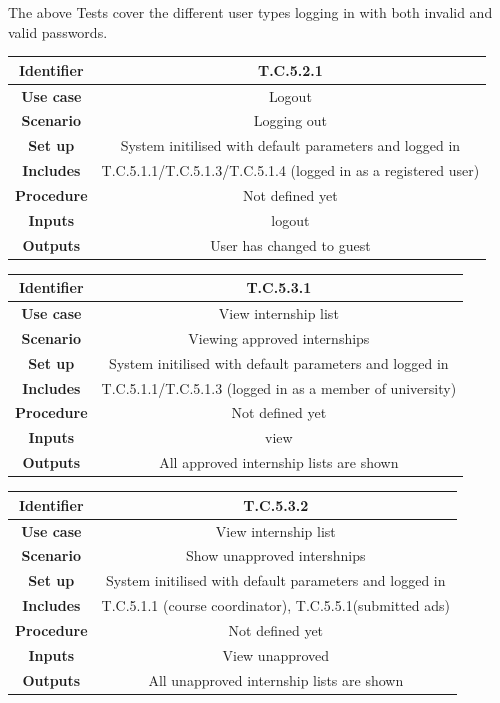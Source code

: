 \documentclass{l3deliverable}
\begin{document}
The above Tests cover the different user types logging in with both
invalid and valid passwords.\\ 

\begin{tabular}{|c|c|}
\hline \textbf{Identifier} & T.C.5.2.1 \\
\hline \textbf{Use case} & Logout \\
\hline \textbf{Scenario} & Logging out\\
\hline \textbf{Set up} & System initilised with default parameters and logged in\\
\hline \textbf{Includes} & T.C.5.1.1/T.C.5.1.3/T.C.5.1.4 (logged in as a registered user)\\
\hline \textbf{Procedure} & Not defined yet\\
\hline \textbf{Inputs} & logout\\
\hline \textbf{Outputs} & User has changed to guest\\
\hline
\end{tabular}

\begin{tabular}{|c|c|}
\hline \textbf{Identifier} & T.C.5.3.1 \\
\hline \textbf{Use case} & View internship list\\
\hline \textbf{Scenario} & Viewing approved internships\\
\hline \textbf{Set up} & System initilised with default parameters and logged in\\
\hline \textbf{Includes} & T.C.5.1.1/T.C.5.1.3 (logged in as a member of university)\\
\hline \textbf{Procedure} & Not defined yet\\
\hline \textbf{Inputs} & view\\
\hline \textbf{Outputs} & All approved internship lists are shown\\
\hline
\end{tabular}

\begin{tabular}{|c|c|}
\hline \textbf{Identifier} & T.C.5.3.2 \\
\hline \textbf{Use case} & View internship list\\
\hline \textbf{Scenario} & Show unapproved intershnips\\
\hline \textbf{Set up} & System initilised with default parameters and logged in\\
\hline \textbf{Includes} &T.C.5.1.1 (course coordinator), T.C.5.5.1(submitted ads)\\
\hline \textbf{Procedure} & Not defined yet\\
\hline \textbf{Inputs} & View unapproved\\
\hline \textbf{Outputs} & All unapproved internship lists are shown\\
\hline
\end{tabular}
\end{document}
